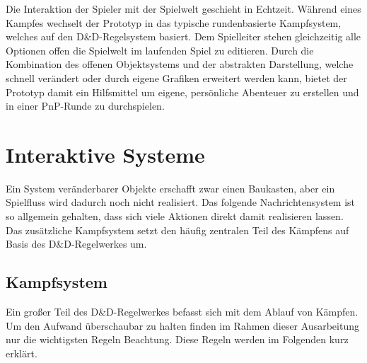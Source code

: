 Die Interaktion der Spieler mit der Spielwelt geschieht in Echtzeit. Während eines Kampfes wechselt der Prototyp in das typische rundenbasierte Kampfsystem, welches auf den D\&D-Regelsystem basiert. Dem Spielleiter stehen gleichzeitig alle Optionen offen die Spielwelt im laufenden Spiel zu editieren.\newline
Durch die Kombination des offenen Objektsystems und der abstrakten Darstellung, welche schnell verändert oder durch eigene Grafiken erweitert werden kann, bietet der Prototyp damit ein Hilfsmittel um eigene, persönliche Abenteuer zu erstellen und in einer PnP-Runde zu durchspielen.


\section{Interaktive Systeme}
\label{sec:InteraktiveSysteme}
Ein System veränderbarer Objekte erschafft zwar einen Baukasten, aber ein Spielfluss wird dadurch noch nicht realisiert. Das folgende Nachrichtensystem ist so allgemein gehalten, dass sich viele Aktionen direkt damit realisieren lassen. Das zusätzliche Kampfsystem setzt den häufig zentralen Teil des Kämpfens auf Basis des D\&D-Regelwerkes um.

\subsection{Kampfsystem}
\label{sec:Kampfsystem}
Ein großer Teil des D\&D-Regelwerkes befasst sich mit dem Ablauf von Kämpfen. Um den Aufwand überschaubar zu halten finden im Rahmen dieser Ausarbeitung nur die wichtigsten Regeln Beachtung. Diese Regeln werden im Folgenden kurz erklärt.~\cite{SRD35}

